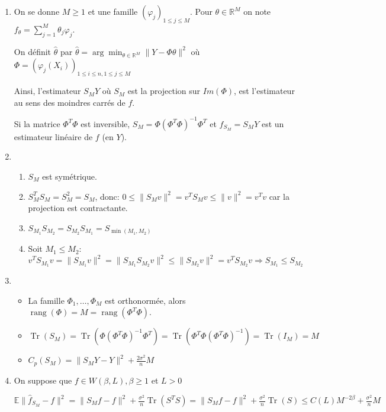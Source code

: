 \documentclass[10pt,a4paper,oneside]{article}
\newcommand{\argmin}{\arg\!\min}
\DeclareMathOperator{\Tr}{Tr}
\DeclareMathOperator{\rang}{rang}
\begin{document}
\begin{enumerate}
\item
On se donne $M \geq 1$ et une famille $(\varphi_j)_{1 \leq j \leq M}$. Pour $\theta \in \mathbb{R}^M$ on note $f_\theta = \sum_{j = 1}^M \theta_j \varphi_j$.

On définit $\hat{\theta}$ par $\hat{\theta} = \argmin_{\theta \in \mathbb{R}^M} \| Y - \Phi \theta \|^2$ où $\Phi = (\varphi_j(X_i))_{1 \leq i \leq n, 1 \leq j \leq M}$

Ainsi, l'estimateur $S_M Y$ où $S_M$ est la projection sur $Im(\Phi)$, est l'estimateur au sens des moindres carrés de $f$.

Si la matrice $\Phi^T \Phi$ est inversible, $S_M = \Phi (\Phi^T \Phi)^{-1} \Phi^T$ et $\hat{f}_{S_M} = S_M Y$ est un estimateur linéaire de $f$ (en $Y$).

\item
\begin{enumerate}
\item
$S_M$ est symétrique.
\item
$S_M^T S_M = S_M^2 = S_M$, donc: $0 \leq \| S_Mv \|^2 = v^T S_M v \leq \| v \|^2 = v^T v$ car la projection est contractante.
\item
$S_{M_1} S_{M_2} = S_{M_2} S_{M_1} = S_{\min(M_1,M_2)}$
\item
Soit $M_1 \leq M_2$: $v^T S_{M_1} v = \| S_{M_1} v \|^2 = \| S_{M_1} S_{M_2} v \|^2 \leq \| S_{M_2} v \| ^2= v^T S_{M_2} v \Rightarrow S_{M_1} \leq S_{M_2}$
\end{enumerate}

\item
\begin{itemize}
\item
La famille $\Phi_1, \ldots, \Phi_M$ est orthonormée, alors $\rang(\Phi) = M = \rang(\Phi^T \Phi)$.

\item
$\Tr(S_M) = \Tr(\Phi (\Phi^T \Phi)^{-1} \Phi^T) = \Tr(\Phi^T \Phi (\Phi^T \Phi)^{-1}) = \Tr(I_M) = M$

\item
$C_p(S_M) = \| S_M Y - Y \|^2 + \frac{2\sigma^2}{n} M$
\end{itemize}

\item
On suppose que $f \in W(\beta, L), \beta \geq 1$ et $L > 0$

$\mathbb{E} \| \hat{f}_{S_M} - f \|^2 = \| S_M f - f \|^2 + \frac{\sigma^2}{n} \Tr(S^TS) = \| S_M f - f \|^2 + \frac{\sigma^2}{n} \Tr(S) \leq C(L) M^{-2\beta} + \frac{\sigma^2}{n}M$


\end{enumerate}
\end{document}
